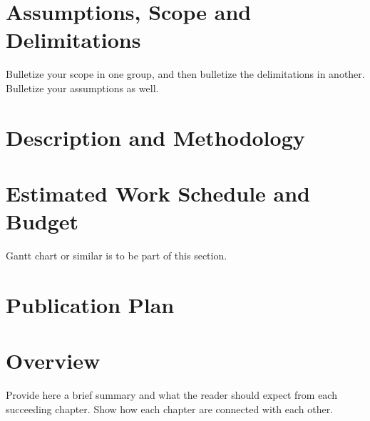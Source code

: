 \section{Assumptions, Scope and Delimitations}

Bulletize your scope in one group, and then bulletize the delimitations in another.  Bulletize your assumptions as well.


\section{Description and Methodology}

\blindtext


\ifFinished
\else

\section{Estimated Work Schedule and Budget}

Gantt chart or similar is to be part of this section.

\blindtext

\section{Publication Plan}
\blindtext

\fi


\section{Overview}

Provide here a brief summary and what the reader should expect from each succeeding chapter.  Show how each chapter are connected with each other.

